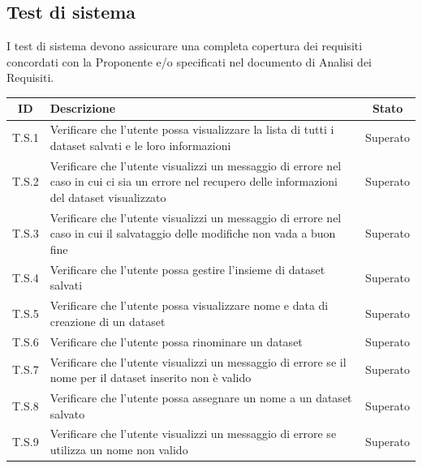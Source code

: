 \subsection{Test di sistema}
\label{subsec:test_sistema}
I test di sistema devono assicurare una completa copertura dei requisiti concordati
con la Proponente e/o specificati nel documento di Analisi dei Requisiti.\\

\begin{tabularx}{\textwidth}{|c|X|c|}
    \hline
    \textbf{ID} & \textbf{Descrizione} & \textbf{Stato}\\
    \hline
    \label{ts:ts1}T.S.1 & Verificare che l'utente possa visualizzare la lista di tutti i dataset salvati e le loro informazioni& Superato \\
    \hline
    \label{ts:ts2}T.S.2 & Verificare che l'utente visualizzi un messaggio di errore nel caso in cui ci sia un errore nel recupero delle informazioni del dataset visualizzato& Superato \\
    \hline
    \label{ts:ts3}T.S.3 & Verificare che l'utente visualizzi un messaggio di errore nel caso in cui il salvataggio delle modifiche non vada a buon fine& Superato \\
    \hline
    \label{ts:ts4}T.S.4 & Verificare che l'utente possa gestire l'insieme di dataset salvati & Superato \\ 
    \hline
    \label{ts:ts5}T.S.5 & Verificare che l'utente possa visualizzare nome e data di creazione di un dataset & Superato \\
    \hline
    \label{ts:ts6}T.S.6 & Verificare che l'utente possa rinominare un dataset & Superato \\
    \hline
    \label{ts:ts7}T.S.7 & Verificare che l'utente visualizzi un messaggio di errore se il nome per il dataset inserito non è valido & Superato \\
    \hline
    \label{ts:ts8}T.S.8 & Verificare che l'utente possa assegnare un nome a un dataset salvato & Superato \\
    \hline
    \label{ts:ts9}T.S.9 & Verificare che l'utente visualizzi un messaggio di errore se utilizza un nome non valido & Superato \\
    \hline
\end{tabularx}

